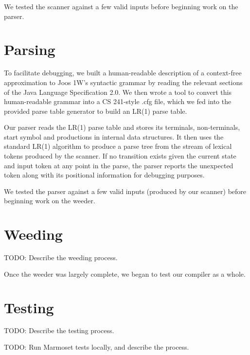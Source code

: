 \documentclass[12pt]{article}
\begin{document}
We tested the scanner against a few valid inputs before beginning work on the parser.

\section{Parsing}

To facilitate debugging, we built a human-readable description of a context-free approximation to Joos 1W's syntactic grammar by reading the relevant sections of the Java Language Specification 2.0.  We then wrote a tool to convert this human-readable grammar into a CS 241-style .cfg file, which we fed into the provided parse table generator to build an LR(1) parse table.

Our parser reads the LR(1) parse table and stores its terminals, non-terminals, start symbol and productions in internal data structures.  It then uses the standard LR(1) algorithm to produce a parse tree from the stream of lexical tokens produced by the scanner.  If no transition exists given the current state and input token at any point in the parse, the parser reports the unexpected token along with its positional information for debugging purposes.

We tested the parser against a few valid inputs (produced by our scanner) before beginning work on the weeder.

\section{Weeding}

TODO: Describe the weeding process.

Once the weeder was largely complete, we began to test our compiler as a whole.

\section{Testing}

TODO: Describe the testing process.

TODO: Run Marmoset tests locally, and describe the process.
\end{document}
